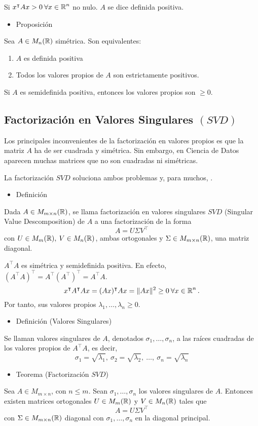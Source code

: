 Si $x^\intercal Ax>0\:\forall x\in\operatorname{\mathbb{R}}^n$ no nulo. $A$ se dice definida positiva.
\begin{itemize}[label=\color{red}\textbullet, leftmargin=*]
	\item \color{lightblue}Proposición
\end{itemize}
Sea $A\in M_n(\operatorname{\mathbb{R}})$ simétrica. Son equivalentes:
\begin{enumerate}[label=\color{lightblue}\roman*)]
	\item $A$ es definida positiva
	\item Todos los valores propios de $A$ son estrictamente positivos.
\end{enumerate}
Si $A$ es semidefinida positiva, entonces los valores propios son $\ge0$.
\subsection{Factorización en Valores Singulares $(SVD)$}
Los principales inconvenientes de la factorización en valores propios es que la matriz $A$ ha de ser cuadrada y simétrica. Sin embargo, en Ciencia de Datos aparecen muchas matrices que no son cuadradas ni simétricas. 

La factorización $SVD$ soluciona ambos problemas y, para muchos, .
\begin{itemize}[label=\color{red}\textbullet, leftmargin=*]
	\item \color{lightblue}Definición
\end{itemize}
Dada $A\in M_{m\times n}(\operatorname{\mathbb{R}})$, se llama factorización en valores singulares $SVD$ (Singular  Value Descomposition) de $A$ a una factorización de la forma \[ A=U\Sigma V^\intercal \]con $U\in M_m(\operatorname{\mathbb{R}}),\:V\in M_n(\operatorname{\mathbb{R}})$, ambas ortogonales y $\Sigma\in M_{m\times n}(\operatorname{\mathbb{R}})$, una matriz diagonal.


$A^\intercal A$ es simétrica y semidefinida positiva. En efecto, $(A^\intercal A)^\intercal=A^\intercal(A^\intercal)^\intercal=A^{\intercal}A$. \[ x^\intercal A^\intercal Ax=(Ax)^\intercal Ax=\|Ax\|^2\ge0\:\forall x\in\operatorname{\mathbb{R}}^n. \]Por tanto, sus valores propios $\lambda_1,\dots,\lambda_n\ge0$.
\begin{itemize}[label=\color{red}\textbullet, leftmargin=*]
	\item \color{lightblue}Definición (Valores Singulares)
\end{itemize}
Se llaman valores singulares de $A$, denotados $\sigma_1,\dots,\sigma_n$, a las raíces cuadradas de los valores propios de $A^\intercal A$, es decir, \[ \sigma_1=\sqrt{\lambda_1},\:\sigma_2=\sqrt{\lambda_2},\:\dots,\:\sigma_n=\sqrt{\lambda_n} \]
\begin{itemize}[label=\color{red}\textbullet, leftmargin=*]
	\item \color{lightblue}Teorema (Factorización $SVD$)
\end{itemize}
Sea $A\in M_{m\times n}$, con $n\le m$. Sean $\sigma_1,\dots,\sigma_n$ los valores singulares de $A$. Entonces existen matrices ortogonales $U\in M_m(\operatorname{\mathbb{R}})$ y $V\in M_n(\operatorname{\mathbb{R}})$ tales que \[ A=U\Sigma V^\intercal \]con $\Sigma\in M_{m\times n}(\operatorname{\mathbb{R}})$ diagonal con  $\sigma_1,\dots,\sigma_n$ en la diagonal principal.

